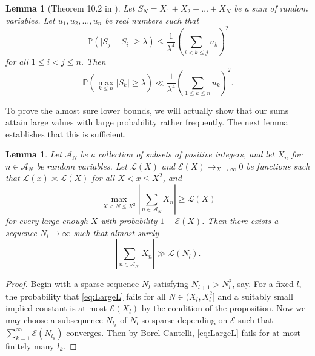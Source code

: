 \documentclass[11pt]{tran-l}
\newtheorem{lemma}[theorem]{Lemma}
\theoremstyle{definition}
\theoremstyle{remark}
\numberwithin{equation}{section}
\begin{document}
\begin{lemma}[Theorem 10.2 in \cite{Billingsley1999Convergence}] \label{lemma:billings} Let $S_N = X_1 + X_2 + \ldots + X_N$ be a sum of random variables. Let $u_1, u_2, \ldots, u_n$ be real numbers such that 
\begin{equation*}
    \mathbb P(\lvert S_j - S_i\rvert\geq\lambda)\leq\frac{1}{\lambda^4}\left(\sum_{i<k\leq j} u_k\right)^2 
\end{equation*} for all $1\leq i<j\leq n$. Then 
\begin{equation*}
    \mathbb P\left(\max_{k\leq n} \lvert S_k\rvert\geq\lambda \right) \ll \frac{1}{\lambda^4}\left(\sum_{1\leq k\leq n} u_k\right)^2 .
\end{equation*}
    
\end{lemma}

To prove the almost sure lower bounds, we will actually show that our sums attain large values with large probability rather frequently. The next lemma establishes that this is sufficient.  

\begin{lemma}\label{lemma:asLbGeneral}
Let $\mathcal A_N$ be a collection of subsets of positive integers, and let $X_n$ for $n\in\mathcal A_N$ be random variables. Let $\mathcal L(X)$ and $\mathcal E(X)\to_{X\to \infty} 0$ be functions such that $\mathcal L(x)\asymp \mathcal L(X)$ for all $X<x\leq X^2$, and 
\begin{equation*}
    \max_{X<N\leq X^2}\left\lvert\sum_{n\in\mathcal A_N} X_n \right\rvert\geq \mathcal L(X)
\end{equation*} for every large enough $X$ with probability $1-\mathcal E(X)$. Then there exists a sequence $N_l\to\infty$ such that almost surely
\begin{equation}\label{eq:LargeL}
    \left\lvert \sum_{n\in\mathcal A_{N_l}} X_n \right\rvert \gg \mathcal L(N_l).
\end{equation}
\end{lemma}

\begin{proof}
   Begin with a sparse sequence $N_l$ satisfying $N_{l+1}>N_l^2$, say. For a fixed $l$, the probability that \eqref{eq:LargeL} fails for all $N\in (X_l, X_l^2]$ and a suitably small implied constant is at most $\mathcal E(X_l)$ by the condition of the proposition. Now we may choose a subsequence $N_{l_k}$ of $N_l$ so sparse depending on $\mathcal E$ such that $\sum_{k=1}^\infty \mathcal E\left(N_{l_k}\right)$ converges. Then by Borel-Cantelli, \eqref{eq:LargeL} fails for at most finitely many $l_k$. 
\end{proof}
\end{document}
